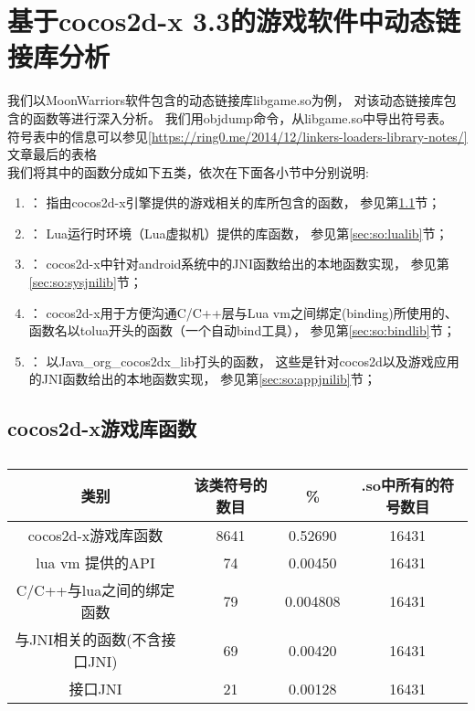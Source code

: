 \section{基于cocos2d-x 3.3的游戏软件中动态链接库分析}
我们以MoonWarriors软件包含的动态链接库libgame.so为例，
对该动态链接库包含的函数等进行深入分析。
我们用objdump命令，从libgame.so中导出符号表。
符号表中的信息可以参见\ref{https://ring0.me/2014/12/linkers-loaders-library-notes/}文章最后的表格\\
我们将其中的函数分成如下五类，依次在下面各小节中分别说明:
\begin{enumerate}
\item {}：
	指由cocos2d-x引擎提供的游戏相关的库所包含的函数，
	参见第\ref{sec:so:cocolib}节；
\item {}：
	Lua运行时环境（Lua虚拟机）提供的库函数，
	参见第\ref{sec:so:lualib}节；
\item {}：
	cocos2d-x中针对android系统中的JNI函数给出的本地函数实现，
	参见第\ref{sec:so:sysjnilib}节；
\item {}：
	cocos2d-x用于方便沟通C/C++层与Lua vm之间绑定(binding)所使用的、
	函数名以tolua开头的函数（一个自动bind工具），
	参见第\ref{sec:so:bindlib}节；
\item {}：
	以Java\_org\_cocos2dx\_lib打头的函数，
	这些是针对cocos2d以及游戏应用的JNI函数给出的本地函数实现，
	参见第\ref{sec:so:appjnilib}节；
\end{enumerate}

\subsection{cocos2d-x游戏库函数}
\label{sec:so:cocolib}

\begin{table}[H]
\caption{}
\begin{tabular}{|c|c|c|c|}
\hline 类别 & 该类符号的数目 & \% & .so中所有的符号数目\\
\hline cocos2d-x游戏库函数& 8641 & 0.52690 & 16431  \\
\hline  lua vm 提供的API & 74 & 0.00450 & 16431 \\
\hline C/C++与lua之间的绑定函数 & 79 &  0.004808 & 16431 \\
\hline 与JNI相关的函数(不含接口JNI) & 69 & 0.00420 & 16431 \\
\hline 接口JNI & 21 & 0.00128 & 16431 \\
\end{tabular}
\end{table}

